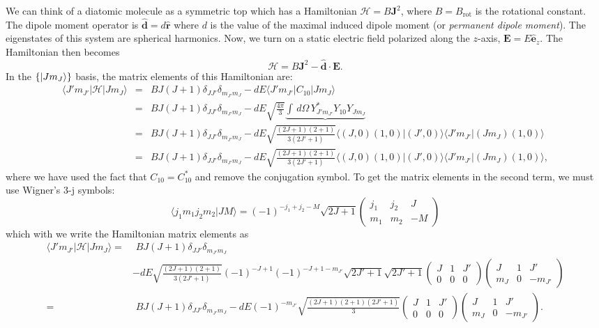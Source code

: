 \documentclass{article}
\theoremstyle{definition}
\newcommand{\nn}{\nonumber}
\newcommand{\ham}{\mathcal{H}}
\newcommand{\f}[2]{\frac{#1}{#2}}
\newcommand{\tj}[6]{ \begin{pmatrix}
		#1 & #2 & #3 \\
		#4 & #5 & #6 
\end{pmatrix}}
\begin{document}
We can think of a diatomic molecule as a symmetric top which has a Hamiltonian $\mathcal{H} = B\mathbf{J}^2$, where $B = B_\text{rot}$ is the rotational constant. The dipole moment operator is $\hat{\mathbf{d}} = d \hat{\mathbf{r}}$ where $d$ is the value of the maximal induced dipole moment (or \textit{permanent dipole moment}). The eigenstates of this system are spherical harmonics. Now, we turn on a static electric field polarized along the $z$-axis, $\bm{E} = E\hat{\bm{e}}_z$. The Hamiltonian then becomes
\begin{equation}
\ham = B \bm{J}^2 - \hat{\bm{d}} \cdot \bm{E}.
\end{equation}
In the $\{ \ket{J m_J} \}$ basis, the matrix elements of this Hamiltonian are:
\begin{eqnarray}
\langle J' m_{J'} | \ham | J m_J \rangle 
&=&  B J(J+1)\delta_{JJ'}\delta_{m_{J'}m_J} - dE \langle J' m_{J'} | C_{10} | J m_J \rangle \nn \\
&=& B J(J+1)\delta_{JJ'}\delta_{m_{J'}m_J} - dE \sqrt{\f{4\pi}{3}} \underbrace{\int \,d\Omega \, Y_{J' m_{J'}}^* Y_{10} Y_{J m_J}} \nn \\
&=& B J(J+1)\delta_{JJ'}\delta_{m_{J'}m_J} -dE  \sqrt{\f{(2J+1)(2+1)}{3(2J'+1)}} \langle (J, 0) (1,0) | (J', 0)  \rangle  \langle J' m_{J'}|(J m_J)(1,0)\rangle \nn \\
&=& B J(J+1)\delta_{JJ'}\delta_{m_{J'}m_J} -dE  \sqrt{\f{(2J+1)(2+1)}{3(2J'+1)}} \langle (J, 0) (1,0) | (J', 0)  \rangle  \langle J' m_{J'}|(J m_J)(1,0)\rangle,
\end{eqnarray}
where we have used the fact that $C_{10} = C_{10}^*$ and remove the conjugation symbol. To get the matrix elements in the second term, we must use Wigner's 3-j symbols:
\begin{equation}
\langle j_1 m_1 j_2 m_2 | J M \rangle = (-1)^{-j_1 +j_2 -M} \sqrt{2J+1} 
\tj{j_1}{j_2}{J}{m_1}{m_2}{-M}
\end{equation}
which with we write the Hamiltonian matrix elements as 
\begin{align}
\langle J' m_{J'} | \ham | J m_J \rangle 
=&\,\,B J(J+1)\delta_{JJ'}\delta_{m_{J'}m_J} \nn \\
&-dE \sqrt{\f{(2J+1)(2+1)}{3(2J'+1)}} 
(-1)^{-J + 1} (-1)^{-J + 1 -m_{J'}} \sqrt{2J'+1} \sqrt{2J'+1} \tj{J}{1}{J'}{0}{0}{0} 
\tj{J}{1}{J'}{m_J}{0}{-m_{J'}} \nn \\
= &\,\, B J(J+1)\delta_{JJ'}\delta_{m_{J'}m_J}  -dE (-1)^{-m_{J'}} \sqrt{\f{(2J+1)(2+1)(2J'+1)}{3}} \tj{J}{1}{J'}{0}{0}{0} \tj{J}{1}{J'}{m_J}{0}{-m_{J'}}.
\end{align}
\end{document}
